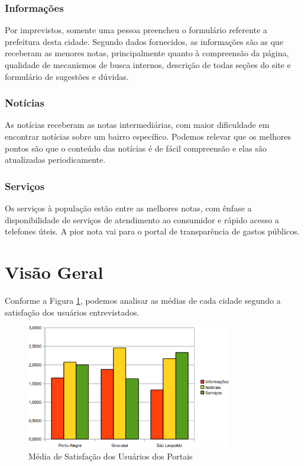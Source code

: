 \documentclass{article}
\begin{document}
\subsubsection{Informações}

Por imprevistos, somente uma pessoa preencheu o formulário referente a
prefeitura desta cidade. Segundo dados fornecidos, as informações são as que
receberam as menores notas, principalmente quanto à compreensão da página,
qualidade de mecanismos de busca internos, descrição de todas seções do site e
formulário de sugestões e dúvidas.

\subsubsection{Notícias}

As notícias receberam as notas intermediárias, com maior dificuldade em
encontrar notícias sobre um bairro específico. Podemos relevar que os melhores
pontos são que o conteúdo das notícias é de fácil compreensão e elas são
atualizadas periodicamente.

\subsubsection{Serviços}

Os serviços à população estão entre as melhores notas, com ênfase a
disponibilidade de serviços de atendimento ao consumidor e rápido acesso a
telefones úteis. A pior nota vai para o portal de transparência de gastos
públicos.

\section{Visão Geral}
\label{sec:visaogeral}

Conforme a Figura \ref{fig:mediapref}, podemos analisar as médias de cada cidade
segundo a satisfação dos usuários entrevistados.

\begin{figure}[ht]
    \centering{}
    \includegraphics[width=0.8\textwidth]{images/grafico.png}
    \caption{Média de Satisfação dos Usuários dos Portais}
    \label{fig:mediapref}
\end{figure}
\end{document}
